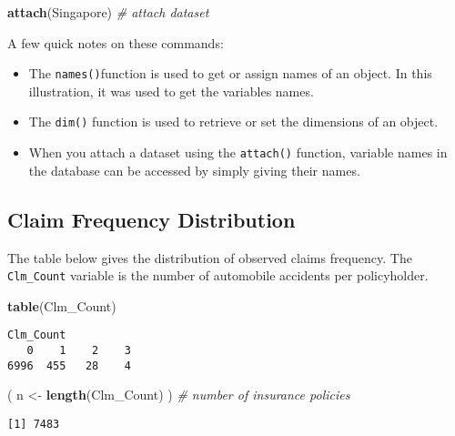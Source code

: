 \documentclass[]{book}
\newenvironment{Shaded}{\begin{snugshade}}{\end{snugshade}}
\newcommand{\KeywordTok}[1]{\textcolor[rgb]{0.13,0.29,0.53}{\textbf{#1}}}
\newcommand{\StringTok}[1]{\textcolor[rgb]{0.31,0.60,0.02}{#1}}
\newcommand{\CommentTok}[1]{\textcolor[rgb]{0.56,0.35,0.01}{\textit{#1}}}
\newcommand{\NormalTok}[1]{#1}
\providecommand{\tightlist}{%
  \setlength{\itemsep}{0pt}\setlength{\parskip}{0pt}}
\theoremstyle{definition}
\theoremstyle{definition}
\theoremstyle{definition}
\theoremstyle{remark}
\begin{document}
\begin{Shaded}
\begin{Highlighting}[]
\KeywordTok{attach}\NormalTok{(Singapore)  }\CommentTok{# attach dataset}
\end{Highlighting}
\end{Shaded}

A few quick notes on these commands:

\begin{itemize}
\tightlist
\item
  The \texttt{names()}function is used to get or assign names of an
  object. In this illustration, it was used to get the variables names.
\item
  The \texttt{dim()} function is used to retrieve or set the dimensions
  of an object.
\item
  When you attach a dataset using the \texttt{attach()} function,
  variable names in the database can be accessed by simply giving their
  names.
\end{itemize}

\subsection{Claim Frequency
Distribution}\label{claim-frequency-distribution-1}

The table below gives the distribution of observed claims frequency. The
\texttt{Clm\_Count} variable is the number of automobile accidents per
policyholder.

\begin{Shaded}
\begin{Highlighting}[]
\KeywordTok{table}\NormalTok{(Clm_Count) }
\end{Highlighting}
\end{Shaded}

\begin{verbatim}
Clm_Count
   0    1    2    3 
6996  455   28    4 
\end{verbatim}

\begin{Shaded}
\begin{Highlighting}[]
\NormalTok{( n <-}\StringTok{ }\KeywordTok{length}\NormalTok{(Clm_Count) )  }\CommentTok{# number of insurance policies }
\end{Highlighting}
\end{Shaded}

\begin{verbatim}
[1] 7483
\end{verbatim}
\end{document}
